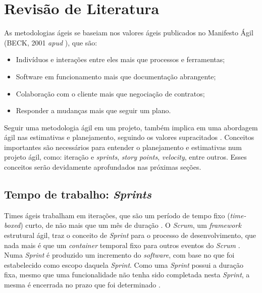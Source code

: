 \chapter{Revisão de Literatura}


  As metodologias ágeis se baseiam nos valores ágeis publicados no Manifesto Ágil
  (BECK, 2001 \textit{apud} ), que são:
  
  \begin{itemize}
   \item Indivíduos e interações entre eles mais que processos e ferramentas;
   \item Software em funcionamento mais que documentação abrangente;
   \item Colaboração com o cliente mais que negociação de contratos;
   \item Responder a mudanças mais que seguir um plano.
  \end{itemize}
  
 Seguir uma metodologia ágil em um projeto, também implica em uma abordagem ágil nas estimativas e planejamento, seguindo 
 os valores supracitados \cite{cohn06}. Conceitos importantes são necessários para entender o planejamento e estimativas
 num projeto ágil, como: iteração e \textit{sprints}, \textit{story points}, \textit{velocity}, entre outros.
 Esses conceitos serão devidamente aprofundados nas próximas seções.
 
\section{Tempo de trabalho: \textit{Sprints}}
 
 Times ágeis trabalham em iterações, que são um período de tempo fixo (\textit{time-boxed}) curto, de não mais que
 um mês de duração \cite{cohn06} \cite{scrum13}. O \textit{Scrum}, um \textit{framework} estrutural ágil, 
 traz o conceito de \textit{Sprint} para o processo de desenvolvimento, que nada mais é que um \textit{container} 
 temporal fixo para outros eventos do \textit{Scrum} \cite{scrum13}. Numa \textit{Sprint} é produzido um incremento 
 do \textit{software}, com base no que foi estabelecido como escopo daquela \textit{Sprint}. Como uma \textit{Sprint} possui
 a duração fixa, mesmo que uma funcionalidade não tenha sido completada nesta \textit{Sprint}, a mesma é encerrada no prazo
 que foi determinado \cite{cohn06}.
 
